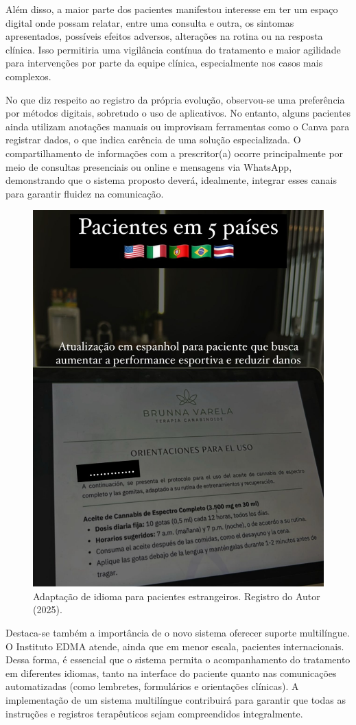 \href{}{}\documentclass[12pt,portuguese,oneside]{article}
\begin{document}
Além disso, a maior parte dos pacientes manifestou interesse em ter um espaço digital onde possam relatar, entre uma consulta e outra, os sintomas apresentados, possíveis efeitos adversos, alterações na rotina ou na resposta clínica. Isso permitiria uma vigilância contínua do tratamento e maior agilidade para intervenções por parte da equipe clínica, especialmente nos casos mais complexos.

No que diz respeito ao registro da própria evolução, observou-se uma preferência por métodos digitais, sobretudo o uso de aplicativos. No entanto, alguns pacientes ainda utilizam anotações manuais ou improvisam ferramentas como o Canva para registrar dados, o que indica carência de uma solução especializada. O compartilhamento de informações com a prescritor(a) ocorre principalmente por meio de consultas presenciais ou online e mensagens via WhatsApp, demonstrando que o sistema proposto deverá, idealmente, integrar esses canais para garantir fluidez na comunicação.

\begin{figure}[H]
    \centering
    \includegraphics[width=0.4\linewidth]{imagens/linguagem.jpeg}
    \caption{Adaptação de idioma para pacientes estrangeiros. Registro do Autor (2025).}
    \label{fig:linguagem.png}
\end{figure}

Destaca-se também a importância de o novo sistema oferecer suporte multilíngue. O Instituto EDMA atende, ainda que em menor escala, pacientes internacionais. Dessa forma, é essencial que o sistema permita o acompanhamento do tratamento em diferentes idiomas, tanto na interface do paciente quanto nas comunicações automatizadas (como lembretes, formulários e orientações clínicas). A implementação de um sistema multilíngue contribuirá para garantir que todas as instruções e registros terapêuticos sejam compreendidos integralmente.
\end{document}
